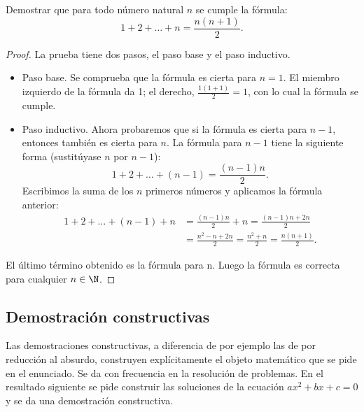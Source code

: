 \begin{theorem}
    Demostrar que para todo número natural $n$ se cumple la fórmula:
    \[
        1 + 2 + \ldots + n = \frac{n(n + 1)}{2}.
    \]
\end{theorem}
\begin{proof}
    La prueba tiene dos pasos, el paso base y el paso inductivo.
    \begin{itemize}
        \item Paso base.
        Se comprueba que la fórmula es cierta para $n = 1$.
        El miembro izquierdo de la fórmula da 1; el derecho, $\frac{1(1 + 1)}{2} = 1$, con lo cual la fórmula se cumple.
        \item Paso inductivo.
        Ahora probaremos que si la fórmula es cierta para $n - 1$, entonces también es cierta para $n$.
        La fórmula para $n - 1$ tiene la siguiente forma (sustitúyase $n$ por $n - 1$):
        \[
            1 + 2 + \ldots + (n - 1) = \frac{(n - 1)n}{2}.
        \]
        Escribimos la suma de los $n$ primeros números y aplicamos la fórmula anterior:
        \begin{align*}
            1 + 2 + \ldots + (n - 1) + n &= \frac{(n - 1)n}{2} + n = \frac{(n - 1)n + 2n}{2}\\[2mm]
            &=\frac{n^2 - n + 2n}{2} = \frac{n^2 + n}{2} = \frac{n(n + 1)}{2}.
        \end{align*}
    \end{itemize}
    El último término obtenido es la fórmula para n.
    Luego la fórmula es correcta para cualquier $n \in \N$.
\end{proof}


\subsection{Demostración constructivas}

Las demostraciones constructivas, a diferencia de por ejemplo las de por reducción al absurdo, construyen explícitamente el objeto matemático que se pide en el enunciado.
Se da con frecuencia en la resolución de problemas.
En el resultado siguiente se pide construir las soluciones de la ecuación $ax^2 + bx + c = 0$ y se da una demostración constructiva.


